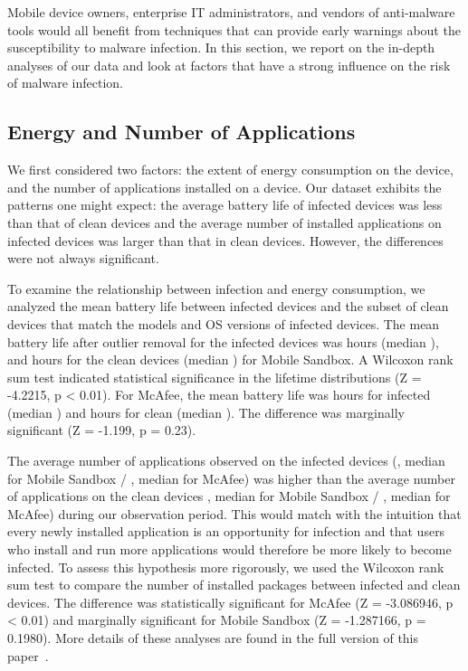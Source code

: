 Mobile device owners, enterprise IT administrators, and vendors of
anti-malware tools would all benefit from techniques that can provide
early warnings about the susceptibility to malware infection. In this
section, we report on the in-depth analyses of our data and look at factors
that have a strong influence on the risk of malware infection.


\ifwww
\subsection{Energy and Number of Applications}
We first considered two factors: the extent of energy consumption on the
device, and the number of applications installed on a device.
Our dataset exhibits the patterns one might expect: the average
battery life of infected devices was less than that of clean devices
and the average number of installed applications on infected devices
was larger than that in clean devices.  However, the differences were
not always significant.  

To examine the relationship between infection and energy consumption,
we analyzed the mean battery life between infected devices and the
subset of clean devices that match the models and OS versions of
infected devices.  The mean battery life after outlier removal for the
infected devices was  hours (median ), and  hours
for the clean devices (median ) for Mobile Sandbox. A Wilcoxon
rank sum test indicated statistical significance in the lifetime
distributions (Z = -4.2215, p < 0.01).  For McAfee, the mean battery
life was  hours for infected (median ) and  hours
for clean (median ). The difference was marginally significant (Z
= -1.199, p = 0.23).

The average number of applications observed on the infected devices
(, median  for Mobile Sandbox / , median  for McAfee)
was higher than the average number of applications on the clean
devices , median  for Mobile Sandbox / , median  for
McAfee) during our observation period. This would match with the
intuition that every newly installed application is an opportunity for
infection and that users who install and run more applications would
therefore be more likely to become infected. To assess this hypothesis
more rigorously, we used the Wilcoxon rank sum test to compare the
number of installed packages between infected and clean devices. The
difference was statistically significant for McAfee (Z = -3.086946, p
< 0.01) and marginally significant for Mobile Sandbox (Z = -1.287166,
p = 0.1980). More details of these analyses are found in the full
version of this paper~\cite{TruongMobileMalware2013}.



